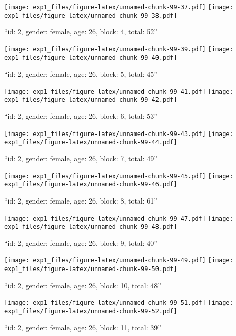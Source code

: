 \documentclass[,]{article}
\begin{document}
\texttt{[image: exp1\_files/figure-latex/unnamed-chunk-99-37.pdf]}
\texttt{[image: exp1\_files/figure-latex/unnamed-chunk-99-38.pdf]}

\newpage
[1] 

``id: 2, gender: female, age: 26, block: 4, total: 52''

\texttt{[image: exp1\_files/figure-latex/unnamed-chunk-99-39.pdf]}
\texttt{[image: exp1\_files/figure-latex/unnamed-chunk-99-40.pdf]}

\newpage
[1] 

``id: 2, gender: female, age: 26, block: 5, total: 45''

\texttt{[image: exp1\_files/figure-latex/unnamed-chunk-99-41.pdf]}
\texttt{[image: exp1\_files/figure-latex/unnamed-chunk-99-42.pdf]}

\newpage
[1] 

``id: 2, gender: female, age: 26, block: 6, total: 53''

\texttt{[image: exp1\_files/figure-latex/unnamed-chunk-99-43.pdf]}
\texttt{[image: exp1\_files/figure-latex/unnamed-chunk-99-44.pdf]}

\newpage
[1] 

``id: 2, gender: female, age: 26, block: 7, total: 49''

\texttt{[image: exp1\_files/figure-latex/unnamed-chunk-99-45.pdf]}
\texttt{[image: exp1\_files/figure-latex/unnamed-chunk-99-46.pdf]}

\newpage
[1] 

``id: 2, gender: female, age: 26, block: 8, total: 61''

\texttt{[image: exp1\_files/figure-latex/unnamed-chunk-99-47.pdf]}
\texttt{[image: exp1\_files/figure-latex/unnamed-chunk-99-48.pdf]}

\newpage
[1] 

``id: 2, gender: female, age: 26, block: 9, total: 40''

\texttt{[image: exp1\_files/figure-latex/unnamed-chunk-99-49.pdf]}
\texttt{[image: exp1\_files/figure-latex/unnamed-chunk-99-50.pdf]}

\newpage
[1] 

``id: 2, gender: female, age: 26, block: 10, total: 48''

\texttt{[image: exp1\_files/figure-latex/unnamed-chunk-99-51.pdf]}
\texttt{[image: exp1\_files/figure-latex/unnamed-chunk-99-52.pdf]}

\newpage
[1] 

``id: 2, gender: female, age: 26, block: 11, total: 39''
\end{document}
